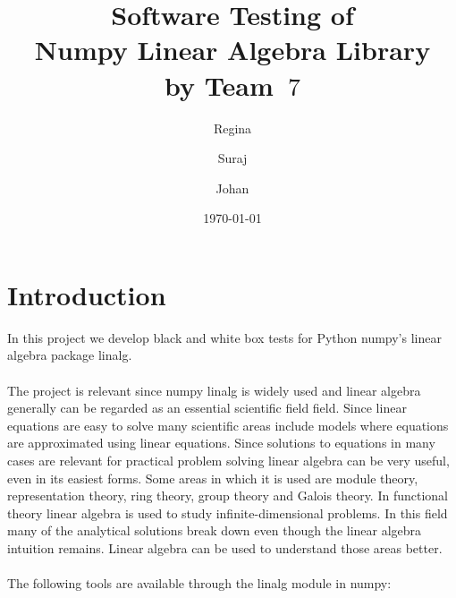\documentclass[a4paper,11pt]{article}
\title{\textbf{Software Testing of \\ Numpy Linear Algebra Library\\
        by Team~$7$                                   %
}
}
\author{Regina \and Suraj \and Johan}  %
\date{\today}
\begin{document}
	\maketitle
	\tableofcontents 
	
\newpage
\section{Introduction}
In this project we develop black and white box tests for Python numpy’s linear algebra package linalg. \\
\\
The project is relevant since numpy linalg is widely used and linear algebra generally can be regarded as an essential scientific field field. Since linear equations are easy to solve many scientific areas include models where equations are approximated using linear equations. Since solutions to equations in many cases are relevant for practical problem solving linear algebra can be very useful, even in its easiest forms. Some areas in which it is used are module theory, representation theory, ring theory, group theory and Galois theory. In functional theory linear algebra is used to study infinite-dimensional problems. In this field many of the analytical solutions break down even though the linear algebra intuition remains. Linear algebra can be used to understand those areas better. \\
\\
The following tools are available through the linalg module in numpy: \\
\\
\end{document}
